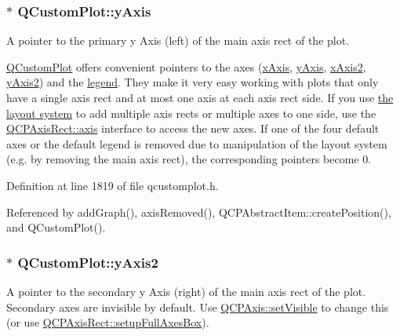 \subsubsection[{y\+Axis}]{ $\ast$ Q\+Custom\+Plot\+::y\+Axis}\label{class_q_custom_plot_af6fea5679725b152c14facd920b19367}
A pointer to the primary y Axis (left) of the main axis rect of the plot.

\hyperlink{class_q_custom_plot}{Q\+Custom\+Plot} offers convenient pointers to the axes (\hyperlink{class_q_custom_plot_a9a79cd0158a4c7f30cbc702f0fd800e4}{x\+Axis}, \hyperlink{class_q_custom_plot_af6fea5679725b152c14facd920b19367}{y\+Axis}, \hyperlink{class_q_custom_plot_ada41599f22cad901c030f3dcbdd82fd9}{x\+Axis2}, \hyperlink{class_q_custom_plot_af13fdc5bce7d0fabd640f13ba805c0b7}{y\+Axis2}) and the \hyperlink{class_q_custom_plot_a4eadcd237dc6a09938b68b16877fa6af}{legend}. They make it very easy working with plots that only have a single axis rect and at most one axis at each axis rect side. If you use \hyperlink{}{the layout system} to add multiple axis rects or multiple axes to one side, use the \hyperlink{class_q_c_p_axis_rect_a560de44e47a4af0f86c59102a094b1e4}{Q\+C\+P\+Axis\+Rect\+::axis} interface to access the new axes. If one of the four default axes or the default legend is removed due to manipulation of the layout system (e.\+g. by removing the main axis rect), the corresponding pointers become 0. 

Definition at line 1819 of file qcustomplot.\+h.



Referenced by add\+Graph(), axis\+Removed(), Q\+C\+P\+Abstract\+Item\+::create\+Position(), and Q\+Custom\+Plot().

\hypertarget{class_q_custom_plot_af13fdc5bce7d0fabd640f13ba805c0b7}{}
\subsubsection[{y\+Axis2}]{ $\ast$ Q\+Custom\+Plot\+::y\+Axis2}\label{class_q_custom_plot_af13fdc5bce7d0fabd640f13ba805c0b7}
A pointer to the secondary y Axis (right) of the main axis rect of the plot. Secondary axes are invisible by default. Use \hyperlink{class_q_c_p_layerable_a3bed99ddc396b48ce3ebfdc0418744f8}{Q\+C\+P\+Axis\+::set\+Visible} to change this (or use \hyperlink{class_q_c_p_axis_rect_a5fa906175447b14206954f77fc7f1ef4}{Q\+C\+P\+Axis\+Rect\+::setup\+Full\+Axes\+Box}).

